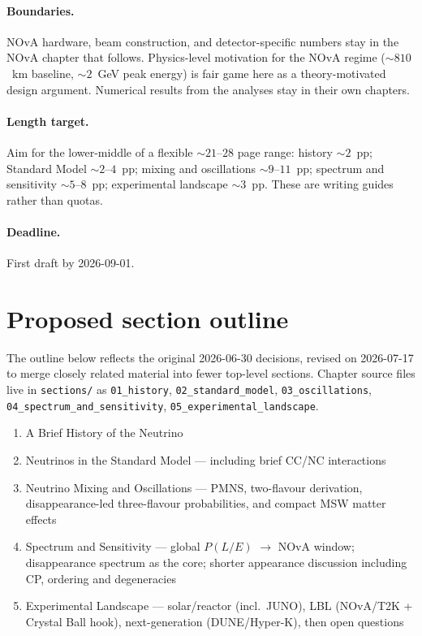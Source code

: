 \documentclass[11pt]{article}
\begin{document}
\paragraph{Boundaries.} NOvA hardware, beam construction, and detector-specific numbers stay in
the NOvA chapter that follows. Physics-level motivation for the NOvA regime ($\sim 810$~km
baseline, $\sim 2$~GeV peak energy) is fair game here as a theory-motivated design argument.
Numerical results from the analyses stay in their own chapters.

\paragraph{Length target.} Aim for the lower-middle of a flexible $\sim 21$--$28$ page range:
history $\sim 2$~pp; Standard Model $\sim 2$--$4$~pp; mixing and oscillations
$\sim 9$--$11$~pp; spectrum and sensitivity $\sim 5$--$8$~pp; experimental landscape
$\sim 3$~pp. These are writing guides rather than quotas.

\paragraph{Deadline.} First draft by 2026-09-01.

\section{Proposed section outline}

The outline below reflects the original 2026-06-30 decisions, revised on 2026-07-17 to
merge closely related material into fewer top-level sections. Chapter source files live in
\texttt{sections/} as \texttt{01\_history}, \texttt{02\_standard\_model},
\texttt{03\_oscillations}, \texttt{04\_spectrum\_and\_sensitivity},
\texttt{05\_experimental\_landscape}.

\begin{enumerate}
    \item A Brief History of the Neutrino
    \item Neutrinos in the Standard Model --- including brief CC/NC interactions
    \item Neutrino Mixing and Oscillations --- PMNS, two-flavour derivation, disappearance-led
    three-flavour probabilities, and compact MSW matter effects
    \item Spectrum and Sensitivity --- global $P(L/E)$ $\to$ NOvA window;
    disappearance spectrum as the core; shorter appearance discussion including CP, ordering
    and degeneracies
    \item Experimental Landscape --- solar/reactor (incl.\ JUNO), LBL (NOvA/T2K + Crystal Ball
    hook), next-generation (DUNE/Hyper-K), then open questions
\end{enumerate}
\end{document}
